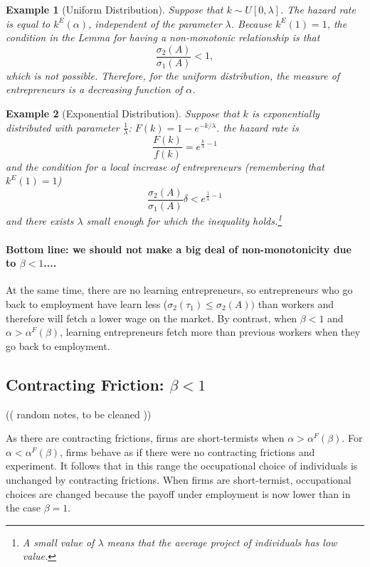 \documentclass[12pt]{article}
\newtheorem{example}{Example}
\begin{document}
%
\begin{example}[Uniform Distribution]
    Suppose that $k\sim U[0,\lambda]$. The hazard rate is equal to $k^E(\alpha)$, independent of the parameter $\lambda$. Because $k^E(1)=1$, the condition in the Lemma for having a non-monotonic relationship is that
    \[
        \frac{\sigma_2(A)}{\sigma_1(A)}<1,
    \]
    which is not possible. Therefore, for the uniform distribution, the measure of entrepreneurs is a decreasing function of $\alpha$.
\end{example}

\begin{example}[Exponential Distribution]
    Suppose that $k$ is exponentially distributed with parameter $\frac{1}{\lambda}$: $F(k)=1-e^{-k/\lambda}$. 
    the hazard rate is
    \[
        \frac{F(k)}{f(k)}= e^{\frac{k}{\lambda}-1}
    \]
    and the condition for a local increase of entrepreneurs (remembering that $k^E(1)=1$)
    \[
        \frac{\sigma_2(A)}{\sigma_1(A)}\delta <e^{\frac{1}{\lambda}-1}
    \]
and there exists $\lambda$ small enough for which the inequality holds.\footnote{%
A small value of $\lambda$ means that the average project of individuals has low value.
}
\end{example}

\paragraph{Bottom line: we should not make a big deal of non-monotonicity due to $\beta<1$....}

At the same time, there are no learning entrepreneurs, so entrepreneurs who go back to employment have learn less ($\sigma_2(\tau_1)\leq \sigma_2(A))$ than workers and therefore will fetch a lower wage on the market. By contrast, when $\beta<1$ and $\alpha>\alpha^F(\beta)$, learning entrepreneurs fetch more than previous workers when they go back to employment.


\subsection{Contracting Friction: $\beta<1$}
 
 (( random notes, to be cleaned ))
 
As there are contracting frictions, firms are short-termists when $\alpha>\alpha^F(\beta)$. For $\alpha<\alpha^F(\beta)$, firms behave as if there were no contracting frictions and experiment. It follows that in this range the occupational choice of individuals is unchanged by contracting frictions. When firms are short-termist, occupational choices are changed because the payoff under employment is now lower than in the case $\beta=1$.
\end{document}
